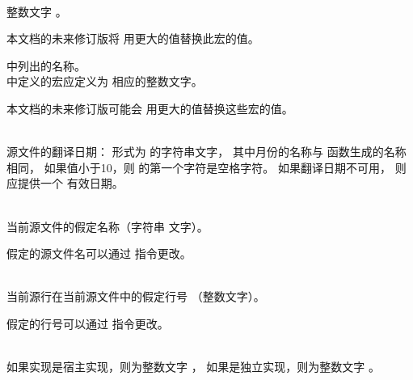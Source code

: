     \begin{description}
    
    \item
    \\
    整数文字 \tcode{\cppver}。
    \begin{note}
    本文档的未来修订版将
    用更大的值替换此宏的值。
    \end{note}
    
    \item {} 中列出的名称。\\
     中定义的宏应定义为
    相应的整数文字。
    \begin{note}
    本文档的未来修订版可能会
    用更大的值替换这些宏的值。
    \end{note}
    
    \item
    \\
    源文件的翻译日期：
    形式为
     的字符串文字，
    其中月份的名称与
    函数生成的名称相同，
    如果值小于10，则  的第一个字符是空格字符。
    如果翻译日期不可用，
    则应提供一个  有效日期。
    
    \item
    \\
    当前源文件的假定名称（字符串
    文字）。
    \begin{footnote}
    假定的源文件名可以通过  指令更改。
    \end{footnote}
    
    \item
    \\
    当前源行在当前源文件中的假定行号
    （整数文字）。
    \begin{footnote}
    假定的行号可以通过  指令更改。
    \end{footnote}
    
    \item
    \\
    如果实现是宿主实现，则为整数文字 ，
    如果是独立实现，则为整数文字 。
    

\end{description}
